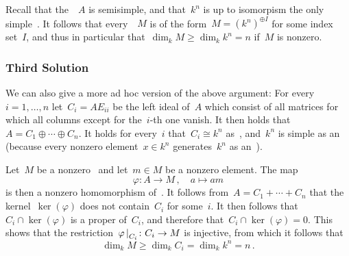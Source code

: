 Recall that the~{\kalg}~$A$ is semisimple, and that~$k^n$ is up to isomorpism the only simple~{}.
It follows that every~{}~$M$ is of the form~$M = (k^n)^{\oplus I}$ for some index set~$I$, and thus in particular that~$\dim_k M \geq \dim_k k^n = n$ if~$M$ is nonzero.



\subsubsection{Third Solution}

We can also give a more ad hoc version of the above argument:
For every~$i = 1, \dotsc, n$ let~$C_i = A E_{ii}$ be the left ideal of~$A$ which consist of all matrices for which all columns except for the~$i$-th one vanish.
It then holds that~$A = C_1 \oplus \dotsb \oplus C_n$.
It holds for every~$i$ that~$C_i \cong k^n$ as~{}, and~$k^n$ is simple as an~{} (because every nonzero element~$x \in k^n$ generates~$k^n$ as an~{}).

Let~$M$ be a nonzero~{} and let~$m \in M$ be a nonzero element.
The map
\[
          \varphi
  \colon  A
  \to     M \,,
  \quad   a
  \mapsto am
\]
is then a nonzero homomorphism of~{}.
It follows from~$A = C_1 + \dotsb + C_n$ that the kernel~$\ker(\varphi)$ does not contain~$C_i$ for some~$i$.
It then follows that~$C_i \cap \ker(\varphi)$ is a proper {} of~$C_i$, and therefore that~$C_i \cap \ker(\varphi) = 0$.
This shows that the restriction~$\restrict{\varphi}{C_i} \colon C_i \to M$ is injective, from which it follows that
\[
        \dim_k M
  \geq  \dim_k C_i
  =     \dim_k k^n
  =     n \,.
\]




